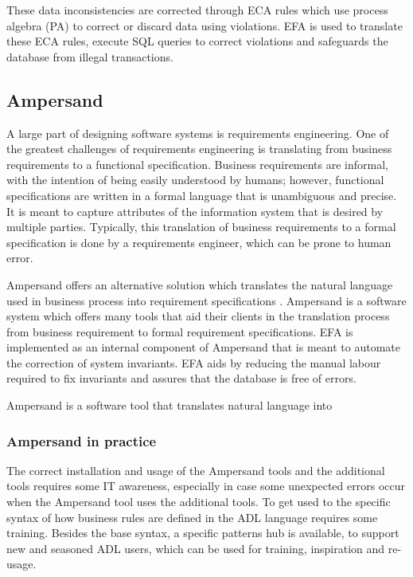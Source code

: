\documentclass[journal,12pt,onecolumn,draftclsnofoot]{article}
\let\Oldsubsection\subsection
\renewcommand{\subsection}{\FloatBarrier\Oldsubsection}
\let\Oldsubsubsection\subsubsection
\renewcommand{\subsubsection}{\FloatBarrier\Oldsubsubsection}
\begin{document}
These data inconsistencies are corrected through ECA rules which use process 
algebra (PA) to correct or discard data using violations. EFA is used to 
translate these ECA rules, execute SQL queries to correct violations and 
safeguards the database from illegal transactions.

\subsection{Ampersand}

A large part of designing software systems is requirements engineering. One
of the greatest challenges of requirements engineering is translating from
business requirements to a functional specification. Business requirements are
informal, with the intention of being easily understood by humans; however,
functional specifications are written in a formal language that is unambiguous 
and precise. It is meant to capture attributes of the information system that 
is desired by multiple parties. Typically, this translation
of business requirements to a formal specification is done by a requirements
engineer, which can be prone to human error.

Ampersand offers an alternative solution which translates the natural language 
used in business process into requirement specifications . Ampersand is a 
software system which offers many tools that aid their clients in the 
translation process from business requirement to formal requirement 
specifications. EFA is implemented as an internal component of Ampersand that 
is meant to automate the correction of system invariants. EFA aids by reducing 
the manual labour required to fix invariants and assures that the database is 
free of errors.  


Ampersand is a software tool that translates natural language into 
\subsubsection*{Ampersand in practice}
\indent The correct installation and usage of the Ampersand tools and the 
additional tools requires
some IT awareness, especially in case some unexpected errors occur when the 
Ampersand tool
uses the additional tools.
To get used to the specific syntax of how business rules are defined in the ADL 
language
requires some training. Besides the base syntax, a specific patterns hub is 
available, to support
new and seasoned ADL users, which can be used for training, inspiration and 
re-usage.
\end{document}
